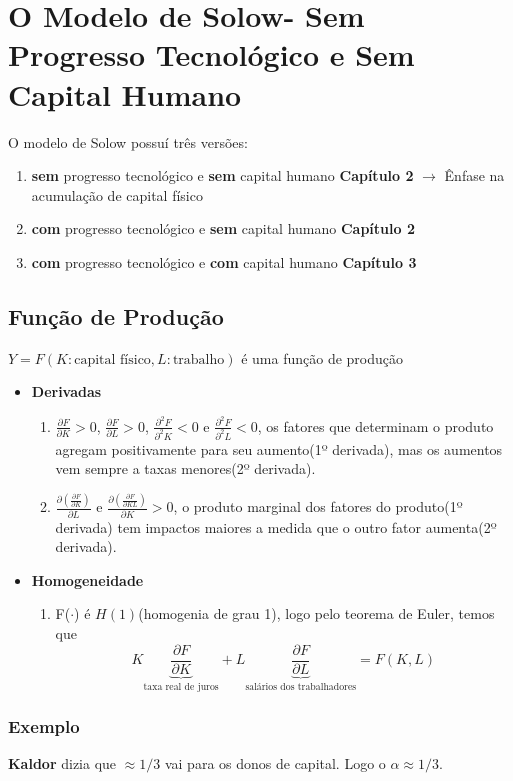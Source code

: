 \documentclass[a4paper,12pt]{article}[abntex2]
\begin{document}
\newpage
\section{\textbf{O Modelo de Solow- Sem Progresso Tecnológico e Sem Capital Humano}}
O modelo de Solow possuí três versões:\begin{enumerate}
    \item \textbf{sem} progresso tecnológico e \textbf{sem} capital humano \textbf{Capítulo 2} \(\rightarrow\) Ênfase na acumulação de capital físico
    \item \textbf{com} progresso tecnológico e \textbf{sem} capital humano \textbf{Capítulo 2}
    \item \textbf{com} progresso tecnológico e \textbf{com} capital humano \textbf{Capítulo 3}
\end{enumerate}
\subsection{Função de Produção}
\(Y=F(K:\text{capital físico},L:\text{trabalho})\) é uma função de produção\begin{itemize}
    \item \textbf{Derivadas}\begin{enumerate}
        \item \(\frac{\partial F}{\partial K}>0\), \(\frac{\partial F}{\partial L}>0\), \(\frac{\partial^2 F}{\partial^2 K}<0\) e \(\frac{\partial^2 F}{\partial^2 L}<0\), os fatores que determinam o produto agregam positivamente para seu aumento(1º derivada), mas os aumentos vem sempre a taxas menores(2º derivada).
        \item \(\frac{\partial (\frac{\partial F}{\partial K})}{\partial L}\) e \(\frac{\partial (\frac{\partial F}{\partial KL})}{\partial K}>0\), o produto marginal dos fatores do produto(1º derivada) tem impactos maiores a medida que o outro fator aumenta(2º derivada).
    \end{enumerate}
    \item \textbf{Homogeneidade}\begin{enumerate}
        \item F(\(\cdot\)) é \(H(1)\)(homogenia de grau 1), logo pelo teorema de Euler, temos que \[K\underbrace{\frac{\partial F}{\partial K}}_\text{taxa real de juros}+L\underbrace{\frac{\partial F}{\partial L}}_\text{salários dos trabalhadores}= F(K,L)\]
    \end{enumerate}
\end{itemize}
\subsubsection{\textbf{Exemplo}}
\textbf{Kaldor} dizia que \(\approx1/3\) vai para os donos de capital. Logo o \(\alpha \approx 1/3\).
\end{document}
